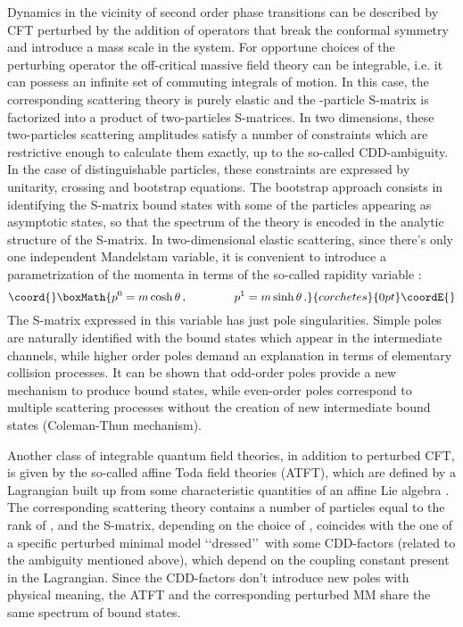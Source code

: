 \documentclass[a4paper,12pt]{report}
\begin{document}
\vspace{0.5cm}

Dynamics in the vicinity of second order phase transitions can be described by CFT perturbed by the addition of
operators that break the conformal symmetry and introduce a mass scale in the system. For opportune choices of the
perturbing operator the off-critical massive field theory can be integrable, i.e. it can possess an infinite set
of commuting integrals of motion. In this case, the corresponding scattering theory is purely elastic and the
\coordHE{}-particle S-matrix is factorized into a product of \coordHE{} two-particles S-matrices. In two dimensions,
these two-particles scattering amplitudes satisfy a number of constraints which are restrictive enough to
calculate them exactly, up to the so-called CDD-ambiguity. In the case of distinguishable particles, these
constraints are expressed by unitarity, crossing and bootstrap equations. The bootstrap approach consists in
identifying the S-matrix bound states with some of the particles appearing as asymptotic states, so that the
spectrum of the theory is encoded in the analytic structure of the S-matrix. In two-dimensional elastic
scattering, since there's only one independent Mandelstam variable, it is convenient to introduce a
parametrization of the momenta in terms of the so-called rapidity variable \myHighlight{$\theta$}\coordHE{}:
\begin{displaymath}\coord{}\boxMath{
p^{0}=m\cosh\theta\,,\qquad\qquad p^{1}=m\sinh\theta \,.
}{corchetes}{0pt}\coordE{}\end{displaymath}
The S-matrix expressed in this variable has just pole singularities. Simple poles are naturally identified with
the bound states which appear in the intermediate channels, while higher order poles demand an explanation in
terms of elementary collision processes. It can be shown that odd-order poles provide a new mechanism to produce
bound states, while even-order poles correspond to multiple scattering processes without the creation of new
intermediate bound states (Coleman-Thun mechanism).

Another class of integrable quantum field theories, in addition to perturbed CFT, is given by the so-called affine
Toda field theories (ATFT), which are defined by a Lagrangian built up from some characteristic quantities of an
affine Lie algebra \coordHE{}. The corresponding scattering theory contains a number of particles equal to the
rank of \coordHE{}, and the S-matrix, depending on the choice of \coordHE{}, coincides with the one of a specific
perturbed minimal model \lq\lq dressed\rq\rq \, with some CDD-factors (related to the ambiguity mentioned above),
which depend on the coupling constant present in the Lagrangian. Since the CDD-factors don't introduce new poles
with physical meaning, the ATFT and the corresponding perturbed MM share the same spectrum of bound states.
\end{document}
